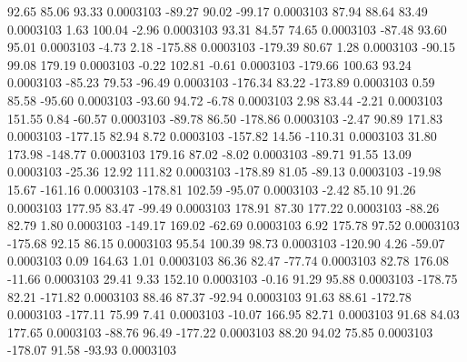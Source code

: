        92.65       85.06       93.33     0.0003103
      -89.27       90.02      -99.17     0.0003103
       87.94       88.64       83.49     0.0003103
        1.63      100.04       -2.96     0.0003103
       93.31       84.57       74.65     0.0003103
      -87.48       93.60       95.01     0.0003103
       -4.73        2.18     -175.88     0.0003103
     -179.39       80.67        1.28     0.0003103
      -90.15       99.08      179.19     0.0003103
       -0.22      102.81       -0.61     0.0003103
     -179.66      100.63       93.24     0.0003103
      -85.23       79.53      -96.49     0.0003103
     -176.34       83.22     -173.89     0.0003103
        0.59       85.58      -95.60     0.0003103
      -93.60       94.72       -6.78     0.0003103
        2.98       83.44       -2.21     0.0003103
      151.55        0.84      -60.57     0.0003103
      -89.78       86.50     -178.86     0.0003103
       -2.47       90.89      171.83     0.0003103
     -177.15       82.94        8.72     0.0003103
     -157.82       14.56     -110.31     0.0003103
       31.80      173.98     -148.77     0.0003103
      179.16       87.02       -8.02     0.0003103
      -89.71       91.55       13.09     0.0003103
      -25.36       12.92      111.82     0.0003103
     -178.89       81.05      -89.13     0.0003103
      -19.98       15.67     -161.16     0.0003103
     -178.81      102.59      -95.07     0.0003103
       -2.42       85.10       91.26     0.0003103
      177.95       83.47      -99.49     0.0003103
      178.91       87.30      177.22     0.0003103
      -88.26       82.79        1.80     0.0003103
     -149.17      169.02      -62.69     0.0003103
        6.92      175.78       97.52     0.0003103
     -175.68       92.15       86.15     0.0003103
       95.54      100.39       98.73     0.0003103
     -120.90        4.26      -59.07     0.0003103
        0.09      164.63        1.01     0.0003103
       86.36       82.47      -77.74     0.0003103
       82.78      176.08      -11.66     0.0003103
       29.41        9.33      152.10     0.0003103
       -0.16       91.29       95.88     0.0003103
     -178.75       82.21     -171.82     0.0003103
       88.46       87.37      -92.94     0.0003103
       91.63       88.61     -172.78     0.0003103
     -177.11       75.99        7.41     0.0003103
      -10.07      166.95       82.71     0.0003103
       91.68       84.03      177.65     0.0003103
      -88.76       96.49     -177.22     0.0003103
       88.20       94.02       75.85     0.0003103
     -178.07       91.58      -93.93     0.0003103
